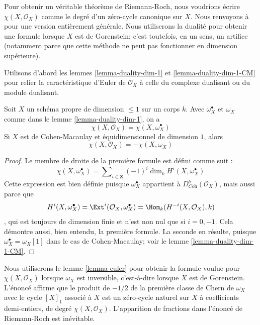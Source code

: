 \medskip\noindent
Pour obtenir un véritable théorème de Riemann-Roch, nous voudrions écrire $\chi(X, \mathcal{O}_X)$ comme le degré d'un zéro-cycle canonique sur $X$. Nous renvoyons à \cite{F} pour une version entièrement générale. Nous utiliserons la dualité pour obtenir une formule lorsque $X$ est de Gorenstein; c'est toutefois, en un sens, un artifice (notamment parce que cette méthode ne peut pas fonctionner en dimension supérieure).

\medskip\noindent
Utilisons d'abord les lemmes \ref{lemma-duality-dim-1} et \ref{lemma-duality-dim-1-CM} pour relier la caractéristique d'Euler de $\mathcal{O}_X$ à celle du complexe dualisant ou du module dualisant.

\begin{lemma}
\label{lemma-euler}
Soit $X$ un schéma propre de dimension $\leq 1$ sur un corps $k$. Avec $\omega_X^\bullet$ et $\omega_X$ comme dans le lemme \ref{lemma-duality-dim-1}, on a $$
\chi(X, \mathcal{O}_X) = \chi(X, \omega_X^\bullet)
$$ Si $X$ est de Cohen-Macaulay et équidimensionnel de dimension $1$, alors
$$
\chi(X, \mathcal{O}_X) = - \chi(X, \omega_X)
$$
\end{lemma}

\begin{proof}
Le membre de droite de la première formule est défini comme suit : $$
\chi(X, \omega_X^\bullet) =
\sum\nolimits_{i \in \mathbf{Z}} (-1)^i\dim_k H^i(X, \omega_X^\bullet)
$$ Cette expression est bien définie puisque $\omega_X^\bullet$ appartient à $D^b_{\textit{Coh}}(\mathcal{O}_X)$, mais aussi parce que $$
H^i(X, \omega_X^\bullet) =
\Ext^i(\mathcal{O}_X, \omega_X^\bullet) =
\Hom_k(H^{-i}(X, \mathcal{O}_X), k)
$$, qui est toujours de dimension finie et n'est non nul que si $i = 0, -1$. Cela démontre aussi, bien entendu, la première formule. La seconde en résulte, puisque $\omega_X^\bullet = \omega_X[1]$ dans le cas de Cohen-Macaulay; voir le lemme \ref{lemma-duality-dim-1-CM}.
\end{proof}

\noindent
Nous utiliserons le lemme \ref{lemma-euler} pour obtenir la formule voulue pour $\chi(X, \mathcal{O}_X)$ lorsque $\omega_X$ est inversible, c'est-à-dire lorsque $X$ est de Gorenstein. L'énoncé affirme que le produit de $-1/2$ de la première classe de Chern de $\omega_X$ avec le cycle $[X]_1$ associé à $X$ est un zéro-cycle naturel sur $X$ à coefficients demi-entiers, de degré $\chi(X, \mathcal{O}_X)$. L'apparition de fractions dans l'énoncé de Riemann-Roch est inévitable.

